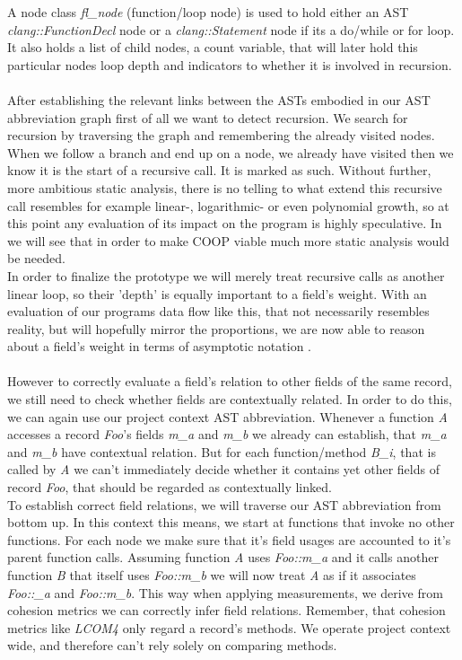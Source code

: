A node class \textit{fl\_node} (function/loop node) is used to hold either an AST \textit{clang::FunctionDecl} node or a \textit{clang::Statement} node if its a do/while or for loop. It also holds a list of child nodes, a count variable, that will later hold this particular nodes loop depth and indicators to whether it is involved in recursion.\\\\
After establishing the relevant links between the ASTs embodied in our AST abbreviation graph first of all we want to detect recursion. We search for recursion by traversing the graph and remembering the already visited nodes. When we follow a branch and end up on a node, we already have visited then we know it is the start of a recursive call. It is marked as such. Without further, more ambitious static analysis, there is no telling to what extend this recursive call resembles for example linear-, logarithmic- or even polynomial growth, so at this point any evaluation of its impact on the program is highly speculative. In  we will see that in order to make COOP viable much more static analysis would be needed.\\
In order to finalize the prototype we will merely treat recursive calls as another linear loop, so their 'depth' is equally important to a field's weight. With an evaluation of our programs data flow like this, that not necessarily resembles reality, but will hopefully mirror the proportions, we are now able to reason about a field's weight in terms of asymptotic notation .\\\\
However to correctly evaluate a field's relation to other fields of the same record, we still need to check whether fields are contextually related. In order to do this, we can again use our project context AST abbreviation. Whenever a function \textit{A} accesses a record \textit{Foo}'s fields \textit{m\_a} and \textit{m\_b} we already can establish, that \textit{m\_a} and \textit{m\_b} have contextual relation. But for each function/method \textit{B\_i}, that is called by \textit{A} we can't immediately decide whether it contains yet other fields of record \textit{Foo}, that should be regarded as contextually linked.\\
To establish correct field relations, we will traverse our AST abbreviation from bottom up. In this context this means, we start at functions that invoke no other functions. For each node we make sure that it's field usages are accounted to it's parent function calls. Assuming function \textit{A} uses \textit{Foo::m\_a} and it calls another function \textit{B} that itself uses \textit{Foo::m\_b} we will now treat \textit{A} as if it associates \textit{Foo::\_a} and \textit{Foo::m\_b}. This way when applying measurements, we derive from cohesion metrics  we can correctly infer field relations. Remember, that cohesion metrics like \textit{LCOM4} only regard a record's methods. We operate project context wide, and therefore can't rely solely on comparing methods.\\
